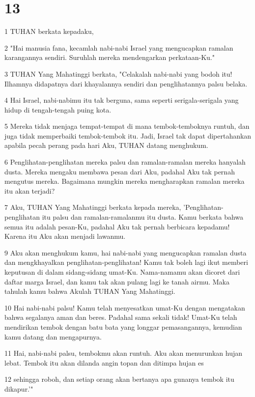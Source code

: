\chapter{13}

\par 1 TUHAN berkata kepadaku,
\par 2 "Hai manusia fana, kecamlah nabi-nabi Israel yang mengucapkan ramalan karangannya sendiri. Suruhlah mereka mendengarkan perkataan-Ku."
\par 3 TUHAN Yang Mahatinggi berkata, "Celakalah nabi-nabi yang bodoh itu! Ilhamnya didapatnya dari khayalannya sendiri dan penglihatannya palsu belaka.
\par 4 Hai Israel, nabi-nabimu itu tak berguna, sama seperti serigala-serigala yang hidup di tengah-tengah puing kota.
\par 5 Mereka tidak menjaga tempat-tempat di mana tembok-temboknya runtuh, dan juga tidak memperbaiki tembok-tembok itu. Jadi, Israel tak dapat dipertahankan apabila pecah perang pada hari Aku, TUHAN datang menghukum.
\par 6 Penglihatan-penglihatan mereka palsu dan ramalan-ramalan mereka hanyalah dusta. Mereka mengaku membawa pesan dari Aku, padahal Aku tak pernah mengutus mereka. Bagaimana mungkin mereka mengharapkan ramalan mereka itu akan terjadi?
\par 7 Aku, TUHAN Yang Mahatinggi berkata kepada mereka, 'Penglihatan-penglihatan itu palsu dan ramalan-ramalanmu itu dusta. Kamu berkata bahwa semua itu adalah pesan-Ku, padahal Aku tak pernah berbicara kepadamu! Karena itu Aku akan menjadi lawanmu.
\par 9 Aku akan menghukum kamu, hai nabi-nabi yang mengucapkan ramalan dusta dan mengkhayalkan penglihatan-penglihatan! Kamu tak boleh lagi ikut memberi keputusan di dalam sidang-sidang umat-Ku. Nama-namamu akan dicoret dari daftar marga Israel, dan kamu tak akan pulang lagi ke tanah airmu. Maka tahulah kamu bahwa Akulah TUHAN Yang Mahatinggi.
\par 10 Hai nabi-nabi palsu! Kamu telah menyesatkan umat-Ku dengan mengatakan bahwa segalanya aman dan beres. Padahal sama sekali tidak! Umat-Ku telah mendirikan tembok dengan batu bata yang longgar pemasangannya, kemudian kamu datang dan mengapurnya.
\par 11 Hai, nabi-nabi palsu, tembokmu akan runtuh. Aku akan menurunkan hujan lebat. Tembok itu akan dilanda angin topan dan ditimpa hujan es
\par 12 sehingga roboh, dan setiap orang akan bertanya apa gunanya tembok itu dikapur.'"
